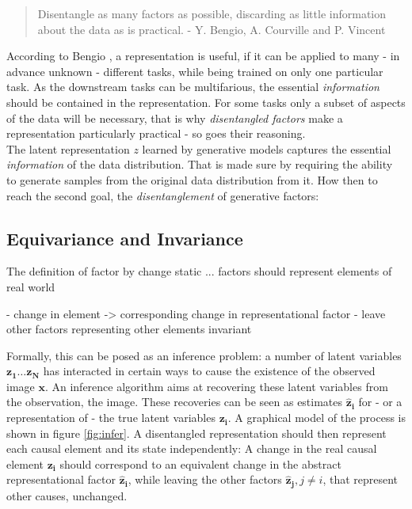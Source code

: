 	\begin{quote}
		{Disentangle as many factors as possible, discarding as little information about the data as is practical.} - Y. Bengio, A. Courville and P. Vincent 
	\end{quote}
	According to Bengio \etal, a representation is useful, if it can be applied to many - in advance unknown - different tasks, while being trained on only one particular task.
	As the downstream tasks can be multifarious, the essential \textit{information} should be contained in the representation.
	For some tasks only a subset of aspects of the data will be necessary, that is why \textit{disentangled factors} make a representation particularly practical - so goes their reasoning.\\
	The latent representation $z$ learned by generative models captures the essential \textit{information} of the data distribution. That is made sure by requiring the ability to generate samples from the original data distribution from it.
	How then to reach the second goal, the \textit{disentanglement} of generative factors:

	\subsection{Equivariance and Invariance}
		The
		definition of factor by change static ...
		factors should represent elements of real world

		- change in element -> corresponding change in representational factor
		- leave other factors representing other elements invariant

		Formally, this can be posed as an inference problem: a number of latent variables $\mathbf{z_1}\ldots\mathbf{z_N}$ has interacted in certain ways to cause the existence of the observed image $\mathbf{x}$. An inference algorithm aims at recovering these latent variables from the observation, \ie the image. These recoveries can be seen as estimates $\mathbf{\hat z_i}$ for - or a representation of - the true latent variables $\mathbf{z_i}$. A graphical model of the process is shown in figure \ref{fig:infer}.
		A disentangled representation should then represent each causal element and its state independently: A change in the real causal element $\mathbf{z_i}$ should correspond to an equivalent change in the abstract representational factor $\mathbf{\hat z_i}$, while leaving the other factors $\mathbf{\hat z_j}, j\neq i$, that represent other causes, unchanged.

